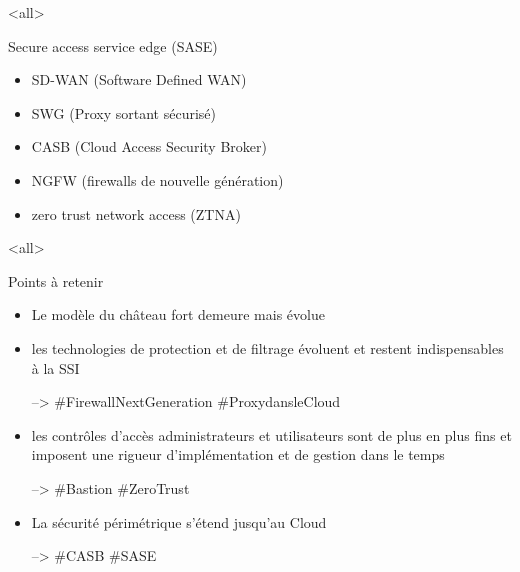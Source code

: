 \mode<all>{\texframe
{Secure access service edge (SASE)} %
{} %
{
\begin{itemize}
    \item SD-WAN (Software Defined WAN)
    \item SWG (Proxy sortant sécurisé)
    \item CASB (Cloud Access Security Broker)
    \item NGFW (firewalls de nouvelle génération)
    \item zero trust network access (ZTNA)
\end{itemize}
}}

\mode<all>{\texframe
{Points à retenir} %
{} %
{
\begin{itemize}
    \item Le modèle du château fort demeure mais évolue
    \item les technologies de protection et de filtrage évoluent et restent indispensables à la SSI
    
    --> \#FirewallNextGeneration \#ProxydansleCloud
    \item les contrôles d'accès administrateurs et utilisateurs sont de plus en plus fins et imposent une rigueur d'implémentation et de gestion dans le temps
    
     --> \#Bastion \#ZeroTrust
    \item La sécurité périmétrique s'étend jusqu'au Cloud
    
     --> \#CASB \#SASE
\end{itemize}
}}
